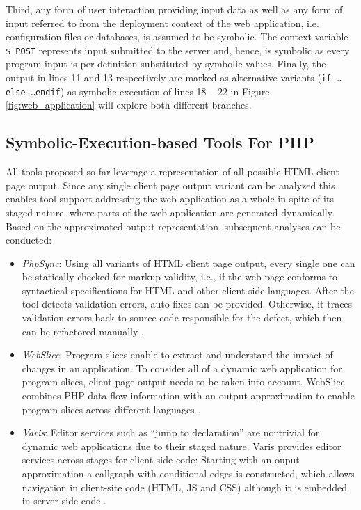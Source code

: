 \documentclass[sigconf]{acmart}
\begin{document}
Third, any form of user interaction providing input data as well as any form of input referred
to from the deployment context of the web application, i.e. configuration files
or databases, is assumed to be symbolic. The context variable
\texttt{\$\_POST} represents input submitted to the server and, hence, is
symbolic as every program input is per definition substituted by symbolic values. Finally, the
output in lines 11 and 13 respectively are marked as alternative variants
(\texttt{if \ldots else \ldots endif}) as symbolic execution of lines 18 – 22
in Figure \ref{fig:web_application} will explore both different branches.

\subsection{Symbolic-Execution-based Tools For PHP}\label{sec:existing_tools}
All tools proposed so far leverage a representation of all possible HTML client
page output. Since any single client page output variant can be analyzed this
enables tool support addressing the web application as a whole in spite of its
staged nature, where parts of the web application are
generated dynamically.
Based on the approximated output representation, subsequent analyses can be
conducted:
\begin{itemize}
	\item \emph{PhpSync}: Using all variants of  HTML client page output, every
	single one can be statically checked for markup validity, i.e., if the web page
	conforms to syntactical specifications for HTML and other client-side
	languages. After the tool detects validation errors, auto-fixes
	can be provided. Otherwise, it traces validation errors back to
	source code responsible for the defect, which then can be refactored manually
	\cite{Nguyen:2011:AFH:2190078.2190142}. 

	\item \emph{WebSlice}: Program slices enable to extract and understand the
	impact of changes in an application. To consider all of a dynamic web
	application for program slices, client page output needs to be taken into
	account. WebSlice combines PHP data-flow information with an output
	approximation to enable program slices across different languages
	\cite{Nguyen:2015:CPS:2786805.2786872}.

	\item \emph{Varis}: Editor services such as “jump to declaration” are
	nontrivial for dynamic web applications due to their staged nature. Varis
	provides editor services across stages for client-side code: Starting with an
	ouput approximation a callgraph with conditional edges is constructed, which
	allows navigation in client-site code (HTML, JS and CSS) although it is
	embedded in server-side code
	\cite{Nguyen:2015:VIS:2819009.2819140,Nguyen:2014:BCG:2635868.2635928}.

\end{itemize}
\end{document}
